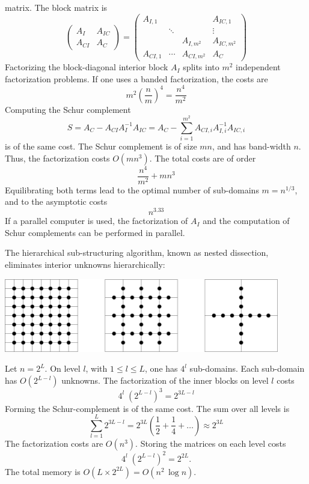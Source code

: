 matrix. The block matrix is
$$
\left( \begin{array}{cc}
        A_I & A_{IC} \\
        A_{CI} & A_C 
        \end{array} \right) =
\left( \begin{array}{ccccc}
        A_{I,1} & & & A_{IC,1} \\
        & \ddots & & \vdots \\
        & & A_{I,m^2} & A_{IC,m^2} \\
        A_{CI,1} & \cdots & A_{CI,m^2} & A_C 
        \end{array} \right)
$$
Factorizing the block-diagonal interior block $A_I$ splits into $m^2$ independent
factorization problems. If one uses a banded factorization, the costs are
$$
m^2 \left( \frac{n}{m} \right)^4 = \frac{n^4}{m^2}
$$
Computing the Schur complement
$$
S = A_C - A_{CI} A_I^{-1} A_{IC} = A_C - \sum_{i=1}^{m^2} A_{CI,i} A_{I,i}^{-1} A_{IC,i}
$$
is of the same cost. The Schur complement is of size $m n$, and has band-width $n$. 
Thus, the factorization costs $O(m n^3)$. The total costs are of order
$$
\frac{n^4}{m^2} + m n^3
$$
Equilibrating both terms lead to the optimal number of sub-domains 
$m = n^{1/3}$, and to the asymptotic costs
$$
n^{3.33}
$$
If a parallel computer is used, the factorization of $A_I$ and the computation of
Schur complements can be performed in parallel.

\bigskip

The hierarchical sub-structuring algorithm, known as nested dissection, 
eliminates interior unknowns hierarchically:
\begin{center}
\includegraphics[width=12cm]{pictures/hierarchical}
\end{center}
Let $n = 2^L$. On level $l$, with $1 \leq l \leq L$, one has
$4^{l}$ sub-domains. Each sub-domain has $O(2^{L-l})$ unknowns.
The factorization of the inner blocks on level $l$ costs
$$
4^l \; (2^{L-l})^3 = 2^{3L - l}
$$
Forming the Schur-complement is of the same cost. The sum over all levels is
$$
\sum_{l=1}^L 2^{3L-l} = 2^{3L} \left( \frac{1}{2} + \frac{1}{4} + \ldots \right) \approx 2^{3L}
$$
The factorization costs are $O(n^3)$. Storing the matrices on each level costs
$$
4^l \; (2^{L-l})^2 = 2^{2L}.
$$
The total memory is $O(L \times 2^{2L}) = O(n^2 \, \log n)$. 


